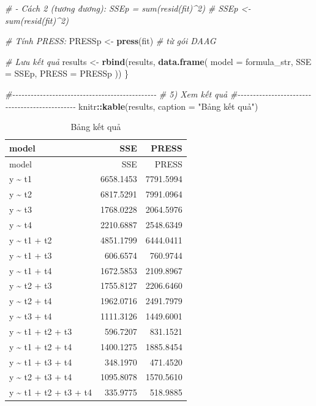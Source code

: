 \documentclass[
]{article}
\newenvironment{Shaded}{\begin{snugshade}}{\end{snugshade}}
\newcommand{\AttributeTok}[1]{\textcolor[rgb]{0.13,0.29,0.53}{#1}}
\newcommand{\CommentTok}[1]{\textcolor[rgb]{0.56,0.35,0.01}{\textit{#1}}}
\newcommand{\FunctionTok}[1]{\textcolor[rgb]{0.13,0.29,0.53}{\textbf{#1}}}
\newcommand{\NormalTok}[1]{#1}
\newcommand{\OtherTok}[1]{\textcolor[rgb]{0.56,0.35,0.01}{#1}}
\newcommand{\SpecialCharTok}[1]{\textcolor[rgb]{0.81,0.36,0.00}{\textbf{#1}}}
\newcommand{\StringTok}[1]{\textcolor[rgb]{0.31,0.60,0.02}{#1}}
\begin{document}
\begin{Shaded}
\begin{Highlighting}[]
  \CommentTok{\# {-} Cách 2 (tương đương): SSEp = sum(resid(fit)\^{}2)}
  \CommentTok{\# SSEp \textless{}{-} sum(resid(fit)\^{}2)}

  \CommentTok{\# Tính PRESS:}
\NormalTok{  PRESSp }\OtherTok{\textless{}{-}} \FunctionTok{press}\NormalTok{(fit)  }\CommentTok{\# từ gói DAAG}

  \CommentTok{\# Lưu kết quả}
\NormalTok{  results }\OtherTok{\textless{}{-}} \FunctionTok{rbind}\NormalTok{(results, }\FunctionTok{data.frame}\NormalTok{(}
    \AttributeTok{model =}\NormalTok{ formula\_str,}
    \AttributeTok{SSE   =}\NormalTok{ SSEp,}
    \AttributeTok{PRESS =}\NormalTok{ PRESSp}
\NormalTok{  ))}
\NormalTok{\}}

\CommentTok{\#{-}{-}{-}{-}{-}{-}{-}{-}{-}{-}{-}{-}{-}{-}{-}{-}{-}{-}{-}{-}{-}{-}{-}{-}{-}{-}{-}{-}{-}{-}{-}{-}{-}{-}{-}{-}{-}{-}{-}{-}{-}{-}{-}{-}{-}{-}{-}}
\CommentTok{\# 5) Xem kết quả}
\CommentTok{\#{-}{-}{-}{-}{-}{-}{-}{-}{-}{-}{-}{-}{-}{-}{-}{-}{-}{-}{-}{-}{-}{-}{-}{-}{-}{-}{-}{-}{-}{-}{-}{-}{-}{-}{-}{-}{-}{-}{-}{-}{-}{-}{-}{-}{-}{-}{-}}
\NormalTok{knitr}\SpecialCharTok{::}\FunctionTok{kable}\NormalTok{(results, }\AttributeTok{caption =} \StringTok{"Bảng kết quả"}\NormalTok{)}
\end{Highlighting}
\end{Shaded}

\begin{longtable}[]{@{}lrr@{}}
\caption{Bảng kết quả}\tabularnewline
\toprule\noalign{}
model & SSE & PRESS \\
\midrule\noalign{}
\endfirsthead
\toprule\noalign{}
model & SSE & PRESS \\
\midrule\noalign{}
\endhead
\bottomrule\noalign{}
\endlastfoot
y \textasciitilde{} t1 & 6658.1453 & 7791.5994 \\
y \textasciitilde{} t2 & 6817.5291 & 7991.0964 \\
y \textasciitilde{} t3 & 1768.0228 & 2064.5976 \\
y \textasciitilde{} t4 & 2210.6887 & 2548.6349 \\
y \textasciitilde{} t1 + t2 & 4851.1799 & 6444.0411 \\
y \textasciitilde{} t1 + t3 & 606.6574 & 760.9744 \\
y \textasciitilde{} t1 + t4 & 1672.5853 & 2109.8967 \\
y \textasciitilde{} t2 + t3 & 1755.8127 & 2206.6460 \\
y \textasciitilde{} t2 + t4 & 1962.0716 & 2491.7979 \\
y \textasciitilde{} t3 + t4 & 1111.3126 & 1449.6001 \\
y \textasciitilde{} t1 + t2 + t3 & 596.7207 & 831.1521 \\
y \textasciitilde{} t1 + t2 + t4 & 1400.1275 & 1885.8454 \\
y \textasciitilde{} t1 + t3 + t4 & 348.1970 & 471.4520 \\
y \textasciitilde{} t2 + t3 + t4 & 1095.8078 & 1570.5610 \\
y \textasciitilde{} t1 + t2 + t3 + t4 & 335.9775 & 518.9885 \\
\end{longtable}
\end{document}
